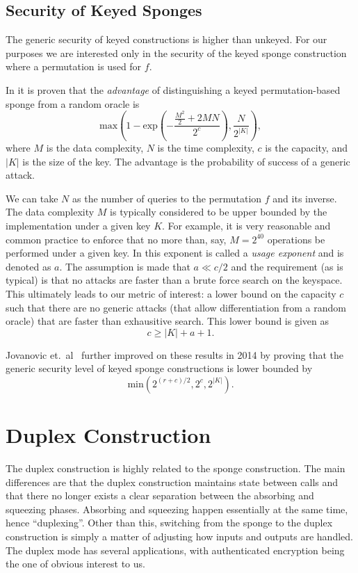 \subsection{Security of Keyed Sponges}
The generic security of keyed constructions is higher than unkeyed.
For our purposes we are interested only in the security of the keyed sponge construction where a permutation is used for $f$. 

In \cite{Bertoni2011_SpongeKeyed} it is proven that the \emph{advantage} of distinguishing a keyed permutation-based sponge from a random oracle is
\begin{equation*}
\mathrm{max}\left( 
  1 - \mathrm{exp}\left(
    -\frac{\frac{M^2}{2}+2MN}{2^c}
  \right),
  \frac{N}{2^{|K|}}
\right),
\end{equation*}
where $M$ is the data complexity, $N$ is the time complexity, $c$ is the capacity, and $|K|$ is the size of the key.
The advantage is the probability of success of a generic attack.

We can take $N$ as the number of queries to the permutation $f$ and its inverse.
The data complexity $M$ is typically considered to be upper bounded by the implementation under a given key $K$.
For example, it is very reasonable and common practice to enforce that no more than, say, $M = 2^{40}$ operations be performed under a given key.
In \cite{Bertoni2011_SpongeKeyed} this exponent is called a \emph{usage exponent} and is denoted as $a$.
The assumption is made that $a \ll c / 2$ and the requirement (as is typical) is that no attacks are faster than a brute force search on the keyspace.
This ultimately leads to our metric of interest: a lower bound on the capacity $c$ such that there are no generic attacks (that allow differentiation from a random oracle) that are faster than exhausitive search.
This lower bound is given as
\begin{equation*} 
c \ge |K| + a + 1.
\end{equation*}

Jovanovic et.~al\ \cite{Jovanovic2014_Beyond} further improved on these results in 2014 by proving that the generic security level of keyed sponge constructions is lower bounded by 
\begin{equation*}
\mathrm{min}(2^{(r+c)/2}, 2^c, 2^{|K|}).
\end{equation*} 

\section{Duplex Construction}
The duplex construction is highly related to the sponge construction.
The main differences are that the duplex construction maintains state between calls and that there no longer exists a clear separation between the absorbing and squeezing phases.
Absorbing and squeezing happen essentially at the same time, hence ``duplexing''.
Other than this, switching from the sponge to the duplex construction is simply a matter of adjusting how inputs and outputs are handled.
The duplex mode has several applications, with authenticated encryption being the one of obvious interest to us.

